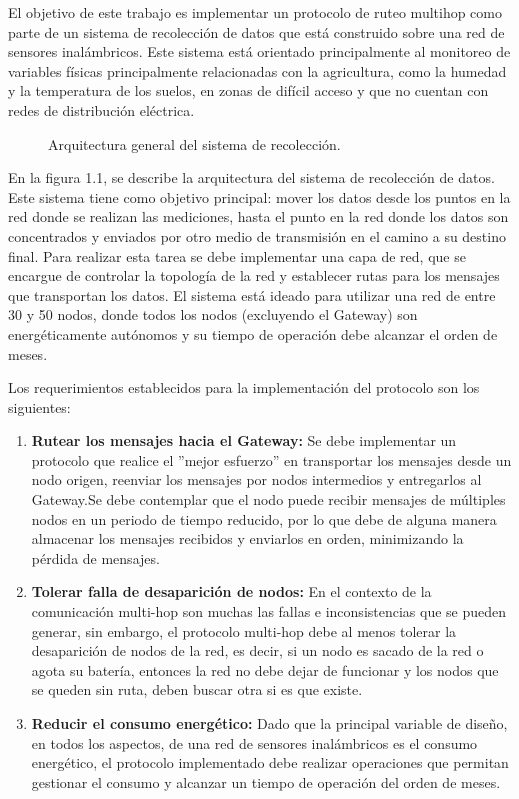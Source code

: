 El objetivo de este trabajo es implementar un protocolo de ruteo multihop como parte de un sistema de recolección de datos que está construido sobre una red de sensores inalámbricos. Este sistema está orientado principalmente al monitoreo de variables físicas principalmente relacionadas con la agricultura, como la humedad y la temperatura de los suelos, en zonas de difícil acceso y que no cuentan con redes de distribución eléctrica.

\begin{figure}[H]
\caption{Arquitectura general del sistema de recolección.}
\end{figure}

En la figura 1.1, se describe la arquitectura del sistema de recolección de datos. Este sistema tiene como objetivo principal: mover los datos desde los puntos en la red donde se realizan las mediciones, hasta el punto en la red donde los datos son concentrados y enviados por otro medio de transmisión en el camino a su destino final. Para realizar esta tarea se debe implementar una capa de red, que se encargue de controlar la topología de la red y establecer rutas para los mensajes que transportan los datos. El sistema está ideado para utilizar una red de entre 30 y 50 nodos, donde todos los nodos (excluyendo el Gateway) son energéticamente autónomos y su tiempo de operación debe alcanzar el orden de meses.

Los requerimientos establecidos para la implementación del protocolo son los siguientes:

\begin{enumerate}
\item \textbf{Rutear los mensajes hacia el Gateway:} Se debe implementar un protocolo que realice el ''mejor esfuerzo'' en transportar los mensajes desde un nodo origen, reenviar los mensajes por nodos intermedios y entregarlos al Gateway.Se debe contemplar que el nodo puede recibir mensajes de múltiples nodos en un periodo de tiempo reducido, por lo que debe de alguna manera almacenar los mensajes recibidos y enviarlos en orden, minimizando la pérdida de mensajes.\\

\item \textbf{Tolerar falla de desaparición de nodos:} En el contexto de la comunicación multi-hop son muchas las fallas e inconsistencias que se pueden generar, sin embargo, el protocolo multi-hop debe al menos tolerar la desaparición de nodos de la red, es decir, si un nodo es sacado de la red o agota su batería, entonces la red no debe dejar de funcionar y los nodos que se queden sin ruta, deben buscar otra si es que existe.\\

\item\textbf{Reducir el consumo energético:} Dado que la principal variable de diseño, en todos los aspectos, de una red de sensores inalámbricos es el consumo energético, el protocolo implementado debe realizar operaciones que permitan gestionar el consumo y alcanzar un tiempo de operación del orden de meses. \\
\end{enumerate}

